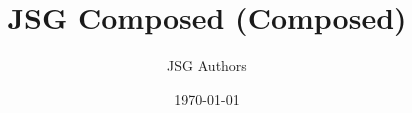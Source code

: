\documentclass[11pt]{article}
\title{JSG Composed (Composed)}
\author{JSG Authors}
\date{\today}
\begin{document}
\maketitle

\newcommand{\JSGWrap}{C}






\nocite{*}
\printbibliography
\end{document}
